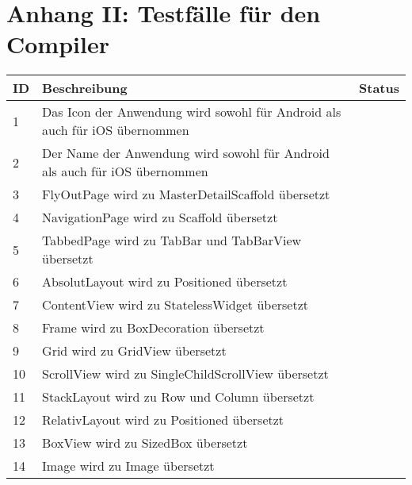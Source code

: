 \chapter{Anhang II: Testfälle für den Compiler}
\label{chap:Testfälle}

\begin{xltabular}{\textwidth}{l|X|l}
   \textbf{ID} & \textbf{Beschreibung} & \textbf{Status}  \\  
\hline

	1             			& 			Das Icon der Anwendung wird sowohl für Android als auch für iOS übernommen       &  \checkmark   	\\ 
	2             			& 			Der Name der Anwendung wird sowohl für Android als auch für iOS übernommen       &  \checkmark   	\\ 

	3            			& 			FlyOutPage wird zu MasterDetailScaffold übersetzt      &  \checkmark   	\\ 
	4            			& 			NavigationPage wird zu Scaffold übersetzt      &  \checkmark   	\\ 
	5            			& 			TabbedPage wird zu TabBar und TabBarView übersetzt      &  \checkmark   	\\ 
	
	
	6            			& 			AbsolutLayout wird zu Positioned übersetzt      &  \checkmark   	\\ 
	7            			& 			ContentView wird zu StatelessWidget übersetzt      &  \checkmark   	\\ 
	8            			& 			Frame wird zu BoxDecoration übersetzt      &  \checkmark   	\\ 
	9            			& 			Grid wird zu GridView übersetzt      &  \checkmark   	\\ 
	10            			& 			ScrollView wird zu SingleChildScrollView übersetzt      &  \checkmark   	\\ 
	11           			& 			StackLayout wird zu Row und Column übersetzt     &  \checkmark   	\\ 
	12            			& 			RelativLayout wird zu Positioned übersetzt      &  \checkmark   	\\ 
	
	
	13            			& 	BoxView		       				wird zu   	 	SizedBox  	übersetzt	 &  \checkmark   	\\ 
	 
	14            			& Image       							wird zu	     	Image	 		übersetzt	 &  \checkmark   	\\ 
	 

\end{xltabular}

